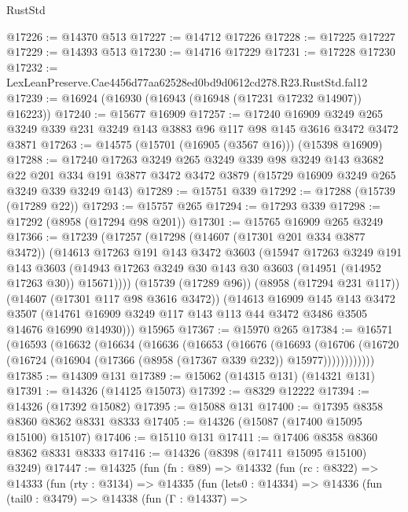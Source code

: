 \begin{lexlean}{RustStd}
\begin{coremodule}
@17226 := @14370 @513
@17227 := @14712 @17226
@17228 := @17225 @17227
@17229 := @14393 @513
@17230 := @14716 @17229
@17231 := @17228 @17230
@17232 := LexLeanPreserve.Cae4456d77aa62528ed0bd9d0612cd278.R23.RustStd.fal12
@17239 := @16924 (@16930 (@16943 (@16948 (@17231 @17232 @14907)) @16223))
@17240 := @15677 @16909
@17257 := @17240
    @16909
    @3249
    @265
    @3249
    @339
    @231
    @3249
    @143
    @3883
    @96
    @117
    @98
    @145
    @3616
    @3472
    @3472
    @3871
@17263 := @14575 (@15701 (@16905 (@3567 @16))) (@15398 @16909)
@17288 := @17240
    @17263
    @3249
    @265
    @3249
    @339
    @98
    @3249
    @143
    @3682
    @22
    @201
    @334
    @191
    @3877
    @3472
    @3472
    @3879
    (@15729 @16909 @3249 @265 @3249 @339 @3249 @143)
@17289 := @15751 @339
@17292 := @17288 (@15739 (@17289 @22))
@17293 := @15757 @265
@17294 := @17293 @339
@17298 := @17292 (@8958 (@17294 @98 @201))
@17301 := @15765 @16909 @265 @3249
@17366 := @17239
    (@17257
      (@17298
        (@14607 (@17301 @201 @334 @3877 @3472))
        (@14613
          @17263
          @191
          @143
          @3472
          @3603
          (@15947
            @17263
            @3249
            @191
            @143
            @3603
            (@14943 @17263 @3249 @30 @143 @30 @3603 (@14951 (@14952 @17263 @30)) @15671))))
      (@15739 (@17289 @96))
      (@8958 (@17294 @231 @117))
      (@14607 (@17301 @117 @98 @3616 @3472))
      (@14613
        @16909
        @145
        @143
        @3472
        @3507
        (@14761 @16909 @3249 @117 @143 @113 @44 @3472 @3486 @3505 @14676 @16990 @14930)))
    @15965
@17367 := @15970 @265
@17384 := @16571
    (@16593
      (@16632
        (@16634
          (@16636
            (@16653
              (@16676
                (@16693
                  (@16706
                    (@16720 (@16724 (@16904 (@17366 (@8958 (@17367 @339 @232)) @15977))))))))))))
@17385 := @14309 @131
@17389 := @15062 (@14315 @131) (@14321 @131)
@17391 := @14326 (@14125 @15073)
@17392 := @8329 @12222
@17394 := @14326 (@17392 @15082)
@17395 := @15088 @131
@17400 := @17395 @8358 @8360 @8362 @8331 @8333
@17405 := @14326 (@15087 (@17400 @15095 @15100) @15107)
@17406 := @15110 @131
@17411 := @17406 @8358 @8360 @8362 @8331 @8333
@17416 := @14326 (@8398 (@17411 @15095 @15100) @3249)
@17447 := @14325
    (fun (fn : @89) =>
    @14332
      (fun (rc : @8322) =>
      @14333
        (fun (rty : @3134) =>
        @14335
          (fun (lets0 : @14334) =>
          @14336
            (fun (tail0 : @3479) =>
            @14338
              (fun (Γ : @14337) =>

\end{coremodule}
\end{lexlean}
